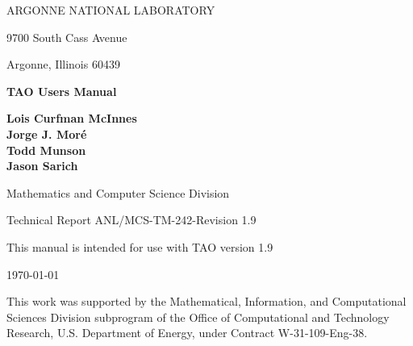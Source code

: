
\vspace{1.75in}

\begin{center}

ARGONNE NATIONAL LABORATORY

9700 South Cass Avenue

Argonne, Illinois  60439

\vspace{1.5in}

{\Large
{\bf 
TAO Users Manual
}
}

\vspace{.5in}

{\bf Lois Curfman McInnes \\ Jorge J. Mor\'e \\ Todd Munson \\ Jason Sarich}

\vspace{.5in}

Mathematics and Computer Science Division

\vspace{.25in}

Technical Report  ANL/MCS-TM-242-Revision 1.9

\vspace{.25in}

This manual is intended for use with TAO version 1.9

\vspace{1.0in}

\today
\end{center}

\vspace{1.5in}

\par\noindent
This work was supported by the Mathematical, Information,
and Computational Sciences Division subprogram of the
Office of Computational and Technology Research,
U.S. Department of Energy, under Contract W-31-109-Eng-38.

